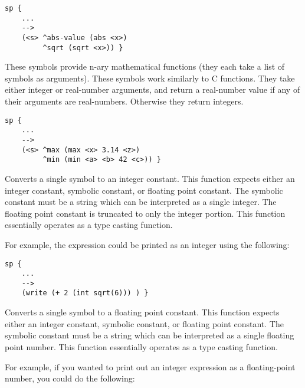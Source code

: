 \begin{description}
\begin{verbatim}
sp {
    ...
    -->
    (<s> ^abs-value (abs <x>)
         ^sqrt (sqrt <x>)) }
\end{verbatim}

\item [\soarb{min, max} --- ]   
		These symbols provide n-ary mathematical functions (they each take a list of symbols as arguments).
		These symbols work similarly to C functions.
		They take either integer or real-number arguments, and return a real-number value if any
		of their arguments are real-numbers. Otherwise they return integers.

\begin{verbatim}
sp {
	...
	-->
	(<s> ^max (max <x> 3.14 <z>)
	     ^min (min <a> <b> 42 <c>)) }
\end{verbatim}


\item [\soarb{int} --- ] Converts a single symbol to an integer constant. This
        function expects either an integer constant, symbolic constant, or
        floating point constant. The symbolic constant must be a string which
        can be interpreted as a single integer. The floating point constant is
        truncated to only the integer portion. This function essentially
        operates as a type casting function.

        For example, the expression  could be printed
        as an integer using the following:

\begin{verbatim}
sp {
    ...
    -->
    (write (+ 2 (int sqrt(6))) ) }
\end{verbatim}

\item [\soarb{float} --- ] Converts a single symbol to a floating point 
constant.
        This function expects either an integer constant, symbolic constant,
        or floating point constant. The symbolic constant must be a string
        which can be interpreted as a single floating point number. This
        function essentially operates as a type casting function. 

        For example, if you wanted to print out an integer expression as a
        floating-point number, you could do the following:


\end{description}
